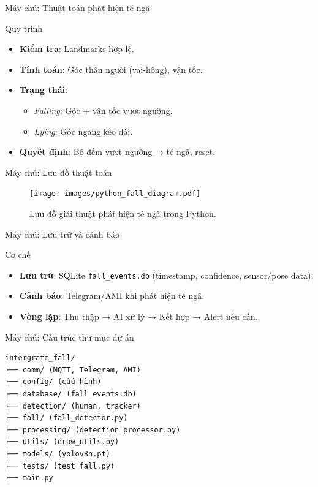 \begin{frame}{Máy chủ: Thuật toán phát hiện té ngã}
    \begin{block}{Quy trình}
        \begin{itemize}
            \item \textbf{Kiểm tra}: Landmarks hợp lệ.
            \item \textbf{Tính toán}: Góc thân người (vai-hông), vận tốc.
            \item \textbf{Trạng thái}: 
                \begin{itemize}
                    \item \textit{Falling}: Góc + vận tốc vượt ngưỡng.
                    \item \textit{Lying}: Góc ngang kéo dài.
                \end{itemize}
            \item \textbf{Quyết định}: Bộ đếm vượt ngưỡng → té ngã, reset.
        \end{itemize}
    \end{block}
\end{frame}

\begin{frame}[fragile]{Máy chủ: Lưu đồ thuật toán}
    \begin{figure}
        \centering
        \texttt{[image: images/python\_fall\_diagram.pdf]}
        \caption{Lưu đồ giải thuật phát hiện té ngã trong Python.}
        \label{fig:python_fall_diagram}
    \end{figure}
\end{frame}

\begin{frame}{Máy chủ: Lưu trữ và cảnh báo}
    \begin{block}{Cơ chế}
        \begin{itemize}
            \item \textbf{Lưu trữ}: SQLite \texttt{fall\_events.db} (timestamp, confidence, sensor/pose data).
            \item \textbf{Cảnh báo}: Telegram/AMI khi phát hiện té ngã.
            \item \textbf{Vòng lặp}: Thu thập → AI xử lý → Kết hợp → Alert nếu cần.
        \end{itemize}
    \end{block}
    \label{subsubsec:data_storage_alerts}
\end{frame}

\begin{frame}[fragile]{Máy chủ: Cấu trúc thư mục dự án}
    \renewcommand{\baselinestretch}{0.8}
    \begin{verbatim}
intergrate_fall/
├── comm/ (MQTT, Telegram, AMI)
├── config/ (cấu hình)
├── database/ (fall_events.db)
├── detection/ (human, tracker)
├── fall/ (fall_detector.py)
├── processing/ (detection_processor.py)
├── utils/ (draw_utils.py)
├── models/ (yolov8n.pt)
├── tests/ (test_fall.py)
├── main.py
    \end{verbatim}
    \renewcommand{\baselinestretch}{1.0}
    \label{subsubsec:project_structure}
\end{frame}
